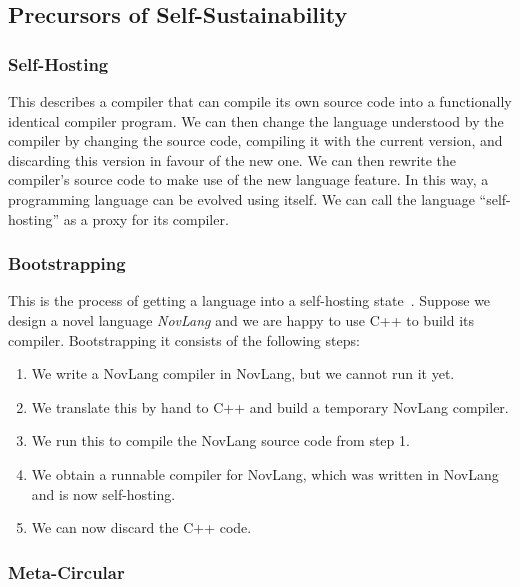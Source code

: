 \documentclass[ twoside,openright,titlepage,numbers=noenddot,headinclude,footinclude,cleardoublepage=empty,abstract=on,
                BCOR=5mm,paper=a4,fontsize=11pt
                ]{scrreprt}
\providecommand{\tightlist}{}\newenvironment{longtable}[2]{\begin{tabular}}{\end{tabular}}
\theoremstyle{definition}
\begin{document}
\hypertarget{precursors-of-self-sustainability}{\subsection{Precursors of
Self-Sustainability}\label{precursors-of-self-sustainability}}

\hypertarget{self-hosting}{\subsubsection{Self-Hosting}\label{self-hosting}}

This describes a compiler that can compile its own source code into a
functionally identical compiler program. We can then change the language
understood by the compiler by changing the source code, compiling it
with the current version, and discarding this version in favour of the
new one. We can then rewrite the compiler's source code to make use of
the new language feature. In this way, a programming language can be
evolved using itself. We can call the language ``self-hosting'' as a
proxy for its compiler.

\hypertarget{bootstrapping}{\subsubsection{Bootstrapping}\label{bootstrapping}}

This is the process of getting a language into a self-hosting
state~\parencite{Bootfrom0}. Suppose we design a novel language
\emph{NovLang} and we are happy to use C++ to build its compiler.
Bootstrapping it consists of the following steps:

\begin{enumerate}
\def\labelenumi{\arabic{enumi}.}
\tightlist
\item
  We write a NovLang compiler in NovLang, but we cannot run it yet.
\item
  We translate this by hand to C++ and build a temporary NovLang
  compiler.
\item
  We run this to compile the NovLang source code from step 1.
\item
  We obtain a runnable compiler for NovLang, which was written in
  NovLang and is now self-hosting.
\item
  We can now discard the C++ code.
\end{enumerate}

\hypertarget{meta-circular}{\subsubsection{Meta-Circular}\label{meta-circular}}
\end{document}
